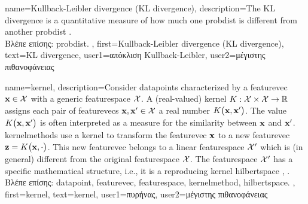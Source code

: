  
 {name={Kullback-Leibler divergence (KL divergence)}, 
 	description={The KL divergence is a quantitative 
 		 measure of how much one \gls{probdist} is different from another \gls{probdist} \cite{coverthomas}.\\
		 \foreignlanguage{greek}{Βλέπε επίσης:} \gls{probdist}.
 	},
 	first={Kullback-Leibler divergence (KL divergence)},
	text={KL divergence},
	user1={\foreignlanguage{greek}{απόκλιση} Kullback-Leibler}, %
  	user2={\foreignlanguage{greek}{μέγιστης πιθανοφάνειας}} %
}

{name={kernel}, 
	description={Consider \gls{datapoint}s characterized by a \gls{featurevec} ${\bf x} \in \mathcal{X}$ 
		with a generic \gls{featurespace} $\mathcal{X}$. A (real-valued) kernel $K: \mathcal{X} \times \mathcal{X} \rightarrow \mathbb{R}$ 
		assigns each pair of \gls{featurevec}s ${\bf x}, {\bf x}' \in \mathcal{X}$ a real number $K\big({\bf x},{\bf x}'\big)$. 
		The value $K\big({\bf x},{\bf x}'\big)$ is often interpreted as a measure for the similarity between ${\bf x}$ 
		and ${\bf x}'$. \Gls{kernelmethod}s use a kernel to transform the \gls{featurevec} ${\bf x}$ to a new \gls{featurevec} ${\bf z} = K\big({\bf x},\cdot\big)$. 
         	This new \gls{featurevec} belongs to a linear \gls{featurespace} $\mathcal{X}'$ which is (in general)  
          	different from the original \gls{featurespace} $\mathcal{X}$. The \gls{featurespace} $\mathcal{X}'$ has 
          	a specific mathematical structure, i.e., it is a reproducing kernel \gls{hilbertspace} \cite{LearningKernelsBook}, \cite{LampertNowKernel}.\\
          \foreignlanguage{greek}{Βλέπε επίσης:} \gls{datapoint}, \gls{featurevec}, \gls{featurespace}, \gls{kernelmethod}, \gls{hilbertspace}.
          },
	first={kernel},
	text={kernel},
	user1={\foreignlanguage{greek}{πυρήνας}}, %
  	user2={\foreignlanguage{greek}{μέγιστης πιθανοφάνειας}} %
}

